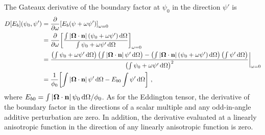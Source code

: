 \documentclass[../doc.tex]{subfiles}
\begin{document}
The Gateaux derivative of the boundary factor at $\psi_0$ in the direction $\psi'$ is 
	\begin{equation}
	\begin{aligned}
		D[E_b](\psi_0,\psi') &= \pderiv{}{\omega}\bracket{E_b(\psi + \omega\psi')}_{\omega=0} \\ 
		&= \pderiv{}{\omega}\bracket{\frac{\int |\Omegahat\cdot\n|\paren{\psi_0 + \omega\psi'} \ud \Omega}{\int \psi_0 + \omega\psi' \ud \Omega}}_{\omega=0} \\
		&= \frac{\paren{\int \psi_0 + \omega\psi' \ud \Omega}\paren{\int |\Omegahat\cdot\n|\,\psi'\ud\Omega} - \paren{\int |\Omegahat\cdot\n|\paren{\psi_0 + \omega\psi'}\ud\Omega}\paren{\int\psi'\ud\Omega}}{\paren{\int \psi_0 + \omega\psi' \ud \Omega}^2} \biggr\rvert_{\omega=0} \\
		&= \frac{1}{\phi_0}\bracket{\int |\Omegahat\cdot\n|\,\psi' \ud \Omega - E_{b0} \int \psi' \ud \Omega} \,,
	\end{aligned}
	\end{equation}
where $E_{b0} = \int |\boldsymbol{\Omega}\cdot\boldsymbol{\mathrm{n}}|\,\psi_0 \mathop{}\!\mathrm{d} \Omega/\phi_0$. As for the Eddington tensor, the derivative of the boundary factor in the directions of a scalar multiple and any odd-in-angle additive perturbation are zero. In addition, the derivative evaluated at a linearly anisotropic function in the direction of any linearly anisotropic function is zero. 
\end{document}
